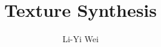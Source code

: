 






\title{Texture Synthesis}

\author{Li-Yi Wei}






\maketitle





\keywordlist

\conceptlist








{

}

\appendix
\normalsize

{
\cleardoublepage
{}





}
{}


